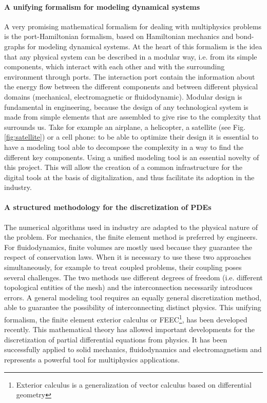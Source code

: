 \documentclass[12pt]{article}
\begin{document}
	\paragraph{\large A unifying formalism for modeling dynamical systems}
	A very promising mathematical formalism for dealing with multiphysics problems is the port-Hamiltonian formalism, based on Hamiltonian mechanics and bond-graphs for modeling dynamical systems. At the heart of this formalism is the idea that any physical system can be described in a modular way, i.e. from its simple components, which interact with each other and with the surrounding environment through ports. The interaction port contain the information about the energy flow between the different components and between different physical domains (mechanical, electromagnetic or fluidodynamic). Modular design is fundamental in engineering, because the design of any technological system is made from simple elements that are assembled to give rise to the complexity that surrounds us. Take for example an airplane, a helicopter, a satellite (see Fig. \ref{fig:satellite}) or a cell phone: to be able to optimize their design it is essential to have a modeling tool able to decompose the complexity in a way to find the different key components. Using a unified modeling tool is an essential novelty of this project. This will allow the creation of a common infrastructure for the digital tools at the basis of digitalization, and thus facilitate its adoption in the industry.

	
	\paragraph{\large A structured methodology for the discretization of PDEs}
	The numerical algorithms used in industry are adapted to the physical nature of the problem. For mechanics, the finite element method is preferred by engineers. For fluidodynamics, finite volumes are mostly used because they guarantee the respect of conservation laws. When it is necessary to use these two approaches simultaneously, for example to treat coupled problems, their coupling poses several challenges. The two methods use different degrees of freedom (i.e. different topological entities of the mesh) and the interconnection necessarily introduces errors. A general modeling tool requires an equally general discretization method, able to guarantee the possibility of interconnecting distinct physics. This unifying formalism, the finite element exterior calculus or FEEC\footnote{Exterior calculus is a generalization of vector calculus based on differential geometry}, has been developed recently. This mathematical theory has allowed important developments for the discretization of partial differential equations from physics. It has been successfully applied to solid mechanics, fluidodynamics and electromagnetism and represents a powerful tool for multiphysics applications. 
	
\end{document}
